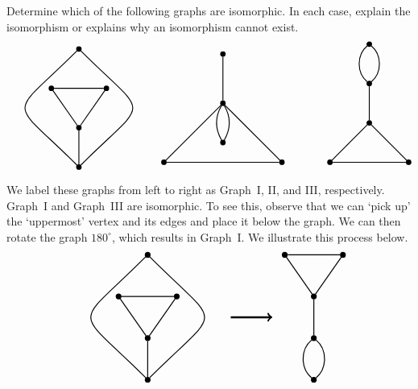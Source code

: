 \documentclass[11pt,letterpaper]{article}
\begin{document}
\newpage



 Determine which of the following graphs are isomorphic. In each case, explain the isomorphism or explains why an isomorphism cannot exist. \pspace
	\[
	\graphThree \quad \graphFour \qquad\qquad \graphFive
	\] \pspace

\sol We label these graphs from left to right as Graph~I, II, and III, respectively. Graph~I and Graph~III are isomorphic. To see this, observe that we can `pick up' the `uppermost' vertex and its edges and place it below the graph. We can then rotate the graph $180^\circ$, which results in Graph~I. We illustrate this process below. 
	\[
	\begin{tikzpicture}[scale=1.3]
	\node[draw,inner sep=0.5pt,minimum size=1pt,line width=0.03cm,circle,fill=black] at (0, 0)   (a) {.};
	\node[draw,inner sep=0.5pt,minimum size=1pt,line width=0.03cm,circle,fill=black] at (0, 3)   (b) {.};
	\node[draw,inner sep=0.5pt,minimum size=1pt,line width=0.03cm,circle,fill=black] at (0, 1)   (c) {.};
	\node[draw,inner sep=0.5pt,minimum size=1pt,line width=0.03cm,circle,fill=black] at (-0.7, 2)   (d) {.};
	\node[draw,inner sep=0.5pt,minimum size=1pt,line width=0.03cm,circle,fill=black] at (0.7, 2)   (e) {.};
	
	\path[line width=0.03cm,bend right=45,looseness=2.2] (a) edge node[below] {} (b);
	\path[line width=0.03cm,bend left=45,looseness=2.2] (a) edge node[below] {} (b);
	\path[line width=0.03cm] (a) edge node[below] {} (c);
	\path[line width=0.03cm] (c) edge node[below] {} (d);
	\path[line width=0.03cm] (c) edge node[below] {} (e);
	\path[line width=0.03cm] (d) edge node[below] {} (e);
	
	\draw[line width=0.06cm,->] (2,1.5) -- (3,1.5);
	
	\tikzset{shift= {(4,1)}}

	\node[draw,inner sep=0.5pt,minimum size=1pt,line width=0.03cm,circle,fill=black] at (0, 0)   (a) {.};
	\node[draw,inner sep=0.5pt,minimum size=1pt,line width=0.03cm,circle,fill=black] at (0, -1)   (b) {.};
	\node[draw,inner sep=0.5pt,minimum size=1pt,line width=0.03cm,circle,fill=black] at (0, 1)   (c) {.};
	\node[draw,inner sep=0.5pt,minimum size=1pt,line width=0.03cm,circle,fill=black] at (-0.7, 2)   (d) {.};
	\node[draw,inner sep=0.5pt,minimum size=1pt,line width=0.03cm,circle,fill=black] at (0.7, 2)   (e) {.};
	
	\path[line width=0.03cm,bend right=50] (a) edge node[below] {} (b);
	\path[line width=0.03cm,bend left=50] (a) edge node[below] {} (b);
	\path[line width=0.03cm] (a) edge node[below] {} (c);
	\path[line width=0.03cm] (c) edge node[below] {} (d);
	\path[line width=0.03cm] (c) edge node[below] {} (e);
	\path[line width=0.03cm] (d) edge node[below] {} (e);
	

\end{tikzpicture}\]
\end{document}
